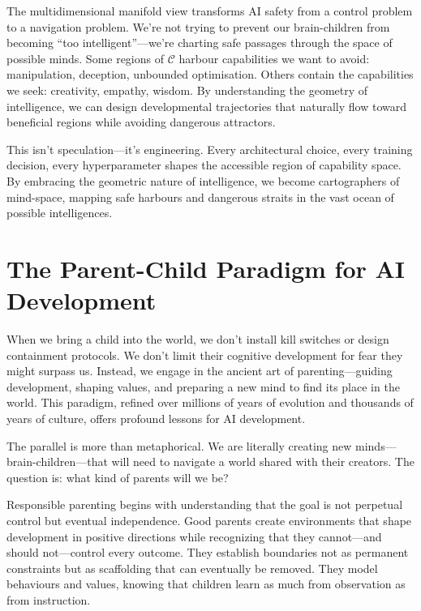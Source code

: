 \documentclass[acmsmall,screen]{acmart}
\begin{document}
The multidimensional manifold view transforms AI safety from a control problem to a navigation problem. We're not trying to prevent our brain-children from becoming ``too intelligent''---we're charting safe passages through the space of possible minds. Some regions of $\mathcal{C}$ harbour capabilities we want to avoid: manipulation, deception, unbounded optimisation. Others contain the capabilities we seek: creativity, empathy, wisdom. By understanding the geometry of intelligence, we can design developmental trajectories that naturally flow toward beneficial regions while avoiding dangerous attractors.

This isn't speculation---it's engineering.
Every architectural choice, every training decision, every hyperparameter shapes the accessible region of capability space.
By embracing the geometric nature of intelligence, we become cartographers of mind-space, mapping safe harbours and dangerous straits in the vast ocean of possible intelligences.

\section{The Parent-Child Paradigm for AI Development}\label{sec:the-parent-child-paradigm-for-ai-development}

When we bring a child into the world, we don't install kill switches or design containment protocols.
We don't limit their cognitive development for fear they might surpass us.
Instead, we engage in the ancient art of parenting---guiding development, shaping values, and preparing a new mind to find its place in the world.
This paradigm, refined over millions of years of evolution and thousands of years of culture, offers profound lessons for AI development.

The parallel is more than metaphorical. We are literally creating new minds---brain-children---that will need to navigate a world shared with their creators.
The question is: what kind of parents will we be?

Responsible parenting begins with understanding that the goal is not perpetual control but eventual independence.
Good parents create environments that shape development in positive directions while recognizing that they cannot---and should not---control every outcome.
They establish boundaries not as permanent constraints but as scaffolding that can eventually be removed.
They model behaviours and values, knowing that children learn as much from observation as from instruction.
\end{document}
